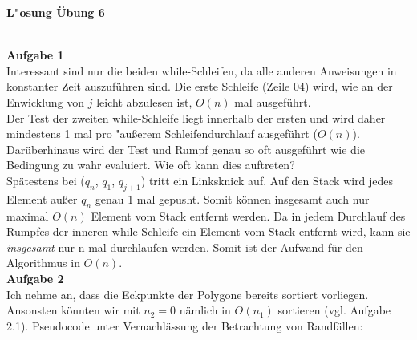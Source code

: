 \documentclass{article}
\newcommand{\serie}{6}
\begin{document}
\begin{large}
\textbf{L"osung \"Ubung \serie}\\ \\
\end{large}
\textbf{Aufgabe 1}\\
Interessant sind nur die beiden while-Schleifen, da alle anderen Anweisungen in konstanter Zeit auszuf\"uhren sind. Die erste Schleife (Zeile 04) wird, wie an der Enwicklung von $j$ leicht abzulesen ist, $O(n)$ mal ausgef\"uhrt.\\
Der Test der zweiten while-Schleife liegt innerhalb der ersten und wird daher mindestens 1 mal pro "au\ss erem Schleifendurchlauf ausgef\"uhrt ($O(n)$). Dar\"uberhinaus wird der Test und Rumpf genau so oft ausgef\"uhrt wie die Bedingung zu wahr evaluiert. Wie oft kann dies auftreten?\\
Sp\"atestens bei ($q_n$, $q_1$, $q_{j+1}$) tritt ein Linksknick auf. Auf den Stack wird jedes Element au\ss er $q_n$ genau 1 mal gepusht. Somit k\"onnen insgesamt auch nur maximal $O(n)$ Element vom Stack entfernt werden. Da in jedem Durchlauf des Rumpfes der inneren while-Schleife ein Element vom Stack entfernt wird, kann sie \textit{insgesamt} nur n mal durchlaufen werden. Somit ist der Aufwand f\"ur den Algorithmus in $O(n)$.\\

\textbf{Aufgabe 2}\\
Ich nehme an, dass die Eckpunkte der Polygone bereits sortiert vorliegen. Ansonsten k\"onnten wir mit $n_2=0$ n\"amlich in $O(n_1)$ sortieren (vgl. Aufgabe 2.1).
Pseudocode unter Vernachl\"assung der Betrachtung von Randf\"allen:
\end{document}
